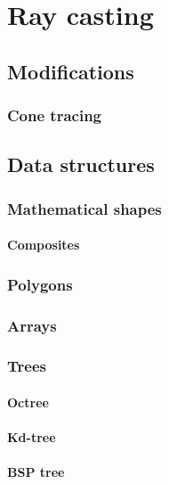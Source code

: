 \section{Ray casting}

\subsection{Modifications}

\subsubsection{Cone tracing}

\subsection{Data structures}

\subsubsection{Mathematical shapes}

\paragraph{Composites}

\subsubsection{Polygons}

\subsubsection{Arrays}

\subsubsection{Trees}

\paragraph{Octree}

\paragraph{Kd-tree}

\paragraph{BSP tree}

